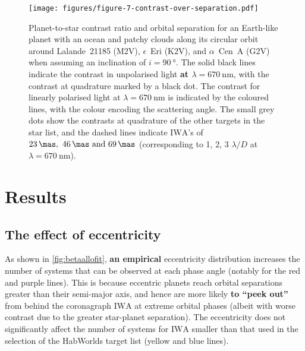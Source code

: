 \documentclass[usenatbib]{mnras}
\newcommand{\IWA}{\ensuremath{\mathrm{IWA}}\xspace}
\newcommand{\HWO}{HabWorlds\xspace}
\begin{document}
\begin{figure*}
    \centering
    \texttt{[image: figures/figure-7-contrast-over-separation.pdf]}
    \caption{
        Planet-to-star contrast ratio and orbital separation for an Earth-like planet with an ocean and patchy clouds along its circular orbit  around Lalande~21185 (M2V), $\epsilon$~Eri (K2V), and $\alpha$~Cen~A (G2V) when assuming an inclination of $i = \qty{90}{\degree}$.
        The solid black lines indicate the contrast in unpolarised light {\bf at $\lambda = \qty{670}{\nano\meter}$}, with the contrast at quadrature marked by a black dot.
        The contrast for linearly polarised light at $\lambda = \qty{670}{\nano\meter}$ is indicated by the coloured lines, with the colour encoding the scattering angle.
        The small grey dots show the contrasts at quadrature of the other targets in the star list, and the dashed lines indicate \IWA's of $\qtylist{23; 46; 69}{\mas}$ (corresponding to 1, 2, 3 $\lambda /D $ at $\lambda = \qty{670}{\nano\meter}$).
    }
    \label{fig:contrasts}
\end{figure*}


\vspace{-1mm}
\section{Results}
\label{sec:3}


\subsection{The effect of eccentricity}
\label{sec:result_eccentricity}

As shown in \cref{fig:betaallofit}, {\bf an empirical} eccentricity distribution increases the number of systems that can be observed at each phase angle (notably for the red and purple lines). 
%
This is because eccentric planets reach orbital separations greater than their semi-major axis, and hence are more likely {\bf to \enquote{peek out}} from behind the coronagraph \IWA at extreme orbital phases (albeit with worse contrast due to the greater star-planet separation). 
%
The eccentricity does not significantly affect the number of systems for \IWA smaller than that used in the selection of the \HWO target list (yellow and blue lines). 
\end{document}
